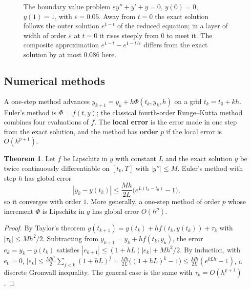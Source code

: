 \documentclass[11pt,a4paper]{article}
\numberwithin{equation}{section}
\theoremstyle{definition}
\newtheorem{thm}{Theorem}[subsection]
\begin{document}
\begin{figure}[H]
\caption{The boundary value problem $\varepsilon y'' + y' + y = 0$, $y(0) = 0$, $y(1) = 1$, with $\varepsilon = 0.05$. Away from $t = 0$ the exact solution follows the outer solution $e^{1-t}$ of the reduced equation; in a layer of width
of order $\varepsilon$ at $t = 0$ it rises steeply from $0$ to meet it. The composite approximation $e^{1-t} - e^{1-t/\varepsilon}$ differs from the exact solution by at most $0.086$ here.}
\label{fig:layer}
\end{figure}

\subsection{Numerical methods}
\label{ssec:numerics}

A one-step method advances $y_{k+1} = y_k + h\Phi(t_k, y_k, h)$ on a grid $t_k = t_0 + kh$. Euler's method is $\Phi = f(t, y)$; the classical fourth-order Runge--Kutta method combines four evaluations of $f$. The \textbf{local
error} is the error made in one step from the exact solution, and the method has \textbf{order} $p$ if the local error is $O(h^{p+1})$.

\begin{thm}
\label{thm:euler}
Let $f$ be Lipschitz in $y$ with constant $L$ and the exact solution $y$ be twice continuously differentiable on $[t_0, T]$ with $|y''| \leq M$. Euler's method with step $h$ has global error
\[
|y_k - y(t_k)| \leq \frac{Mh}{2L}\bigl(e^{L(t_k - t_0)} - 1\bigr) ,
\]
so it converges with order $1$. More generally, a one-step method of order $p$ whose increment $\Phi$ is Lipschitz in $y$ has global error $O(h^p)$.
\end{thm}

\begin{proof}
By Taylor's theorem $y(t_{k+1}) = y(t_k) + hf(t_k, y(t_k)) + \tau_k$ with $|\tau_k| \leq Mh^2/2$. Subtracting from $y_{k+1} = y_k + hf(t_k, y_k)$, the error $e_k = y_k - y(t_k)$ satisfies
$|e_{k+1}| \leq (1 + hL)|e_k| + Mh^2/2$. By induction, with $e_0 = 0$, $|e_k| \leq \frac{Mh^2}{2}\sum_{j<k}(1 + hL)^j = \frac{Mh}{2L}\bigl((1 + hL)^k - 1\bigr) \leq \frac{Mh}{2L}(e^{kLh} - 1)$, a discrete Gronwall inequality. The general case
is the same with $\tau_k = O(h^{p+1})$.
\end{proof}
\end{document}
